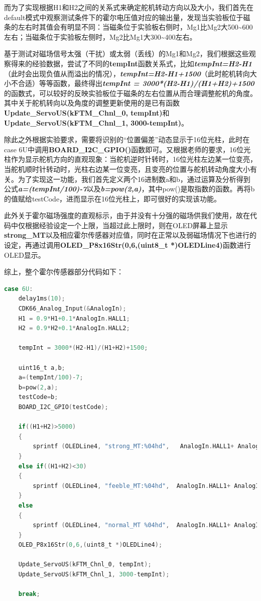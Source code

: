 \par{而为了实现根据H1和H2之间的关系式来确定舵机转动方向以及大小，我们首先在default模式中观察测试条件下的霍尔电压值对应的输出量，发现当实验板位于磁条的左右时其值会有明显不同：当磁条位于实验板右侧时，Mg1比Mg2大500\textasciitilde600左右；当磁条位于实验板左侧时，Mg2比Mg1大300\textasciitilde400左右。}

\par{基于测试对磁场信号太强（干扰）或太弱（丢线）的Mg1和Mg2，我们根据这些观察得来的经验数据，尝试了不同的\textbf{tempInt}函数关系式，比如\emph{\textbf{tempInt=H2-H1}}（此时会出现负值从而溢出的情况），\emph{\textbf{tempInt=H2-H1+1500}}（此时舵机转向大小不合适）等等函数，最终得出\emph{\textbf{tempInt = 3000*(H2-H1)/(H1+H2)+1500}}的函数式，可以较好的反映实验板位于磁条的左右位置从而合理调整舵机的角度。其中关于舵机转向以及角度的调整更新使用的是已有函数\textbf{Update\_ServoUS(kFTM\_Chnl\_0, tempInt)}和\textbf{Update\_ServoUS(kFTM\_Chnl\_1, 3000-tempInt)}。}

\par{除此之外根据实验要求，需要将识别的“位置偏差”动态显示于16位光柱，此时在case 6U中调用\textbf{BOARD\_I2C\_GPIO()}函数即可。又根据老师的要求，16位光柱作为显示舵机方向的直观现象：当舵机逆时针转时，16位光柱左边某一位变亮，当舵机顺时针转动时，光柱右边某一位变亮，且变亮的位置与舵机转动角度大小有关。为了实现这一功能，我们首先定义两个16进制数a和b，通过运算及分析得到公式\textbf{\emph{a=(tempInt/100)-7}}以及\emph{\textbf{b=pow(2,a)}}，其中pow()是取指数的函数。再将b的值赋给testCode，进而显示在16位光柱上，即可很好的实现该功能。}

\par{此外关于霍尔磁场强度的直观标示，由于并没有十分强的磁场供我们使用，故在代码中仅根据经验设定一个上限，当超过此上限时，则在OLED屏幕上显示\textbf{strong\_MT}以及相应霍尔传感器对应值，同时在正常以及弱磁场情况下也进行的设定，再通过调用\textbf{OLED\_P8x16Str(0,6,(uint8\_t *)OLEDLine4)}函数进行OLED显示。}

\par{综上，整个霍尔传感器部分代码如下：}

\begin{lstlisting}[language = C]
case 6U:
    delay1ms(10);
    CDK66_Analog_Input(&AnalogIn);
    H1 = 0.9*H1+0.1*AnalogIn.HALL1;
    H2 = 0.9*H2+0.1*AnalogIn.HALL2;

    tempInt = 3000*(H2-H1)/(H1+H2)+1500;

    uint16_t a,b;
    a=(tempInt/100)-7;
    b=pow(2,a);
    testCode=b;
    BOARD_I2C_GPIO(testCode);

    if((H1+H2)>5000)
    {
        sprintf (OLEDLine4, "strong_MT:%04hd",   AnalogIn.HALL1+ AnalogIn.HALL2);
    }
    else if((H1+H2)<30)
    {
        sprintf (OLEDLine4, "feeble_MT:%04hd",  AnalogIn.HALL1+ AnalogIn.HALL2);
    }
    else
    {
        sprintf (OLEDLine4, "normal_MT %04hd",  AnalogIn.HALL1+ AnalogIn.HALL2);
    }
    OLED_P8x16Str(0,6,(uint8_t *)OLEDLine4);

    Update_ServoUS(kFTM_Chnl_0, tempInt);
    Update_ServoUS(kFTM_Chnl_1, 3000-tempInt);

    break;
\end{lstlisting}

